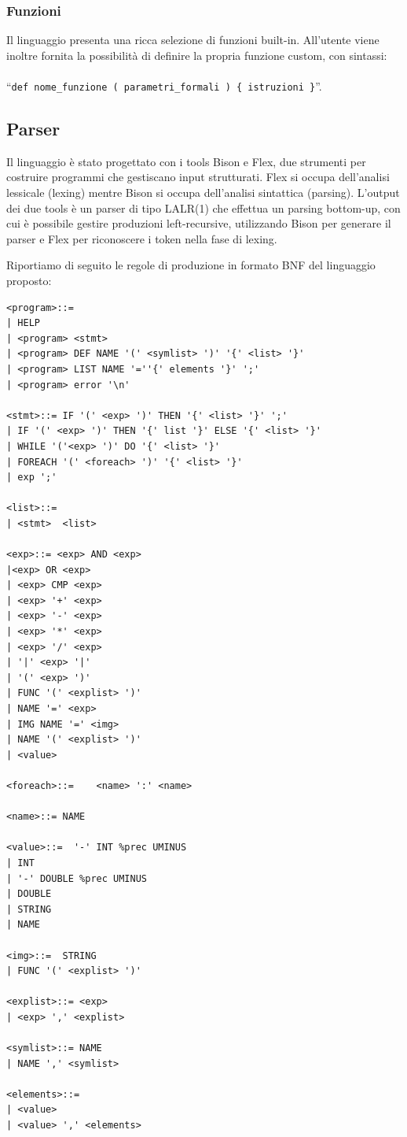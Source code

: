 \documentclass[10pt]{article}
\begin{document}
\subsubsection{Funzioni}
Il linguaggio presenta una ricca selezione di funzioni built-in. All'utente viene inoltre fornita la possibilità di definire la propria funzione custom, con sintassi:\\\\ ``\texttt{def nome\_funzione ( parametri\_formali ) \{ istruzioni \}}''.

\subsection{Parser}
Il linguaggio è stato progettato con i tools Bison e Flex, due strumenti per costruire programmi che gestiscano input strutturati. Flex si occupa dell'analisi lessicale (lexing) mentre Bison si occupa dell'analisi sintattica (parsing). L'output dei due tools è un parser di tipo LALR(1) che effettua un parsing bottom-up, con cui è possibile gestire  produzioni left-recursive, utilizzando Bison per generare il parser e Flex per riconoscere i token nella fase di lexing.

Riportiamo di seguito le regole di produzione in formato BNF del linguaggio proposto:

\begin{lstlisting}
<program>::=
| HELP
| <program> <stmt>    
| <program> DEF NAME '(' <symlist> ')' '{' <list> '}' 
| <program> LIST NAME '=''{' elements '}' ';' 
| <program> error '\n'

<stmt>::= IF '(' <exp> ')' THEN '{' <list> '}' ';'                
| IF '(' <exp> ')' THEN '{' list '}' ELSE '{' <list> '}'   
| WHILE '('<exp> ')' DO '{' <list> '}'                    
| FOREACH '(' <foreach> ')' '{' <list> '}'                 
| exp ';'

<list>::=                               
| <stmt>  <list>                    

<exp>::= <exp> AND <exp>          
|<exp> OR <exp>           
| <exp> CMP <exp>          
| <exp> '+' <exp>          
| <exp> '-' <exp>       
| <exp> '*' <exp>        
| <exp> '/' <exp>       
| '|' <exp> '|'          
| '(' <exp> ')'          
| FUNC '(' <explist> ')' 
| NAME '=' <exp>         
| IMG NAME '=' <img>     
| NAME '(' <explist> ')' 
| <value>                

<foreach>::=    <name> ':' <name>        

<name>::= NAME                       

<value>::=  '-' INT %prec UMINUS      
| INT                          
| '-' DOUBLE %prec UMINUS      
| DOUBLE                       
| STRING                       
| NAME                         

<img>::=  STRING              
| FUNC '(' <explist> ')' 

<explist>::= <exp>          
| <exp> ',' <explist>  

<symlist>::= NAME         
| NAME ',' <symlist> 

<elements>::=                
| <value>               
| <value> ',' <elements>  

\end{lstlisting}
\end{document}
